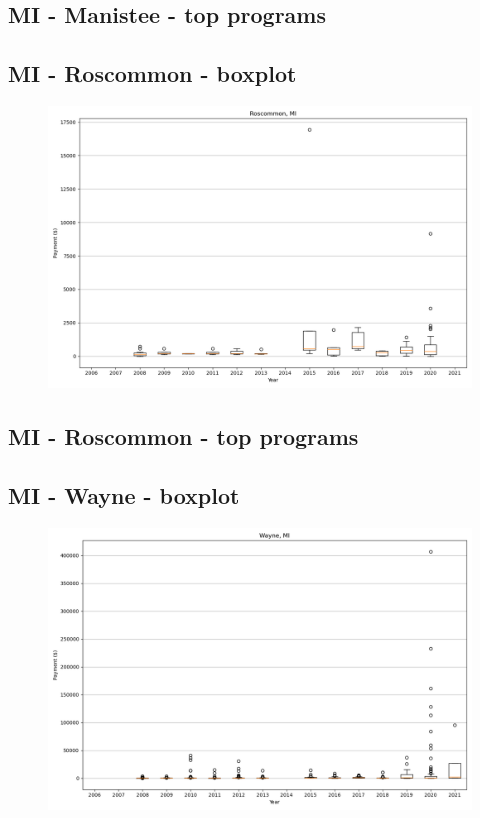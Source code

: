\subsection*{MI - Manistee - top programs}

\newpage
\subsection*{MI - Roscommon - boxplot}
\begin{figure}[h]
\centering
\includegraphics[width=7in]{../output/boxplots/counties/Roscommon-MI_boxplot.png}
\end{figure}


\subsection*{MI - Roscommon - top programs}

\newpage
\subsection*{MI - Wayne - boxplot}
\begin{figure}[h]
\centering
\includegraphics[width=7in]{../output/boxplots/counties/Wayne-MI_boxplot.png}
\end{figure}


